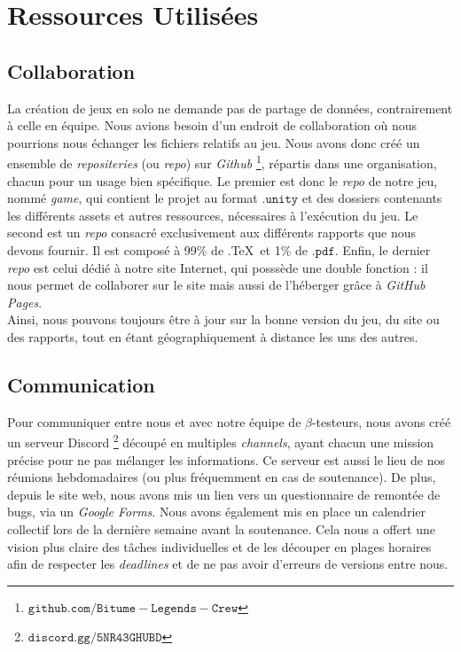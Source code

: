 \documentclass[12pt,a4paper]{article}
\begin{document}
\section{Ressources Utilisées}
    \subsection{Collaboration}
        La création de jeux en solo ne demande pas de partage de données, contrairement 
        à celle en équipe. Nous avions besoin d'un endroit de collaboration où nous 
        pourrions nous échanger les fichiers relatifs au jeu. 
        Nous avons donc créé un ensemble de \textit{repositeries} (ou \textit{repo}) sur \textsl{Github}
        \footnote{\(\mathtt{github.com/Bitume-Legends-Crew}\)}, répartis dans une organisation,
        chacun pour un usage bien spécifique. Le premier est donc le \textit{repo} de
        notre jeu, nommé \textit{game}, qui contient le projet au format \(\mathtt{.unity}\)
        et des dossiers contenants les différents assets et autres ressources,
        nécessaires à l'exécution du jeu. 
        Le second est un \textit{repo} consacré exclusivement aux différents rapports 
        que nous devons fournir. Il est composé à 99\% de .\TeX\, et 1\% de \(\mathtt{.pdf}\).
        Enfin, le dernier \textit{repo} est celui dédié à notre site Internet, qui
        posssède une double fonction : il nous permet de collaborer sur le site
        mais aussi de l'héberger grâce à \textsl{GitHub Pages}.\\
        \indent Ainsi, nous pouvons toujours être à jour sur la bonne version du jeu,
        du site ou des rapports, tout en étant géographiquement à distance les uns 
        des autres.

    \subsection{Communication}
        Pour communiquer entre nous et avec notre équipe de \(\beta\)-testeurs, nous
        avons créé un serveur Discord \footnote{\(\mathtt{discord.gg/5NR43GHUBD}\)}
        découpé en multiples 
        \textit{channels}, ayant chacun une mission précise pour ne pas mélanger les
        informations. Ce serveur est aussi le lieu de nos réunions hebdomadaires 
        (ou plus fréquemment en cas de soutenance). De plus, depuis le site web, nous
        avons mis un lien vers un questionnaire de remontée de bugs, via un \textsl{Google Forms}.
        Nous avons également mis en place un calendrier collectif lors de la
        dernière semaine avant la soutenance. Cela nous a offert une vision plus
        claire des tâches individuelles et de les découper en plages horaires afin de 
        respecter les \textit{deadlines} et de ne pas avoir d'erreurs de versions
        entre nous.
\end{document}
